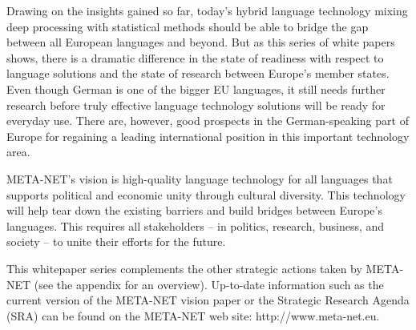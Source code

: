 \documentclass[]{../metanetpaper}
\begin{document}
\begin{multicols}{2}

Drawing on the insights gained so far, today’s hybrid language technology mixing deep processing with statistical methods should be able to bridge the gap between all European languages and beyond. But as this series of white papers shows, there is a dramatic difference in the state of readiness with respect to language solutions and the state of research between Europe’s member states. Even though German is one of the bigger EU languages, it still needs further research before truly effective language technology solutions will be ready for everyday use. There are, however, good prospects in the German-speaking part of Europe for regaining a leading international position in this important technology area. 

META-NET’s vision is high-quality language technology for all languages that supports political and economic unity through cultural diversity. This technology will help tear down the existing barriers and build bridges between Europe’s languages. This requires all stakeholders -- in politics, research, business, and society -- to unite their efforts for the future.

This whitepaper series complements the other strategic actions taken by META-NET (see the appendix for an overview). Up-to-date information such as the current version of the META-NET vision paper \cite{Meta1} or the Strategic Research Agenda (SRA) can be found on the META-NET web site: http://www.meta-net.eu.
\end{multicols}

\clearpage

\end{document}
